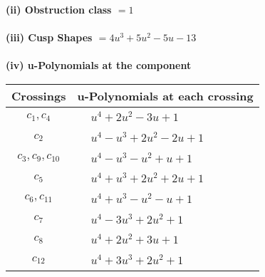 \documentclass[1p]{elsarticle_modified}
\theoremstyle{definition}
\begin{document}
\flushleft \textbf{(ii) Obstruction class $= 1$}\\~\\
\flushleft \textbf{(iii) Cusp Shapes $= 4 u^3+5 u^2-5 u-13$}\\~\\
\newpage\renewcommand{\arraystretch}{1}
\flushleft \textbf{(iv) u-Polynomials at the component}\newline \\
\begin{tabular}{m{50pt}|m{274pt}}
Crossings & \hspace{64pt}u-Polynomials at each crossing \\
\hline $$\begin{aligned}c_{1},c_{4}\end{aligned}$$&$\begin{aligned}
&u^4+2 u^2-3 u+1
\end{aligned}$\\
\hline $$\begin{aligned}c_{2}\end{aligned}$$&$\begin{aligned}
&u^4- u^3+2 u^2-2 u+1
\end{aligned}$\\
\hline $$\begin{aligned}c_{3},c_{9},c_{10}\end{aligned}$$&$\begin{aligned}
&u^4- u^3- u^2+u+1
\end{aligned}$\\
\hline $$\begin{aligned}c_{5}\end{aligned}$$&$\begin{aligned}
&u^4+u^3+2 u^2+2 u+1
\end{aligned}$\\
\hline $$\begin{aligned}c_{6},c_{11}\end{aligned}$$&$\begin{aligned}
&u^4+u^3- u^2- u+1
\end{aligned}$\\
\hline $$\begin{aligned}c_{7}\end{aligned}$$&$\begin{aligned}
&u^4-3 u^3+2 u^2+1
\end{aligned}$\\
\hline $$\begin{aligned}c_{8}\end{aligned}$$&$\begin{aligned}
&u^4+2 u^2+3 u+1
\end{aligned}$\\
\hline $$\begin{aligned}c_{12}\end{aligned}$$&$\begin{aligned}
&u^4+3 u^3+2 u^2+1
\end{aligned}$\\
\hline
\end{tabular}\\~\\
\end{document}
